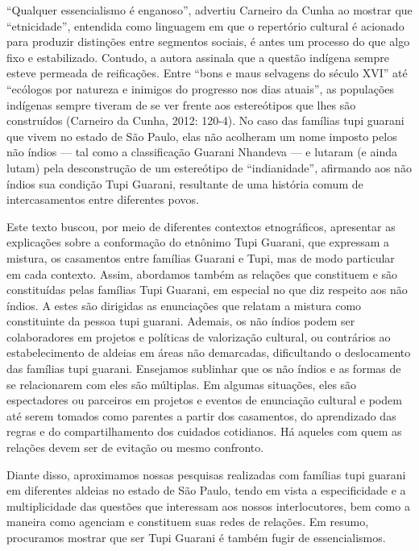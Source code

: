 ``Qualquer essencialismo é enganoso'', advertiu Carneiro da Cunha ao
mostrar que ``etnicidade'', entendida como linguagem em que o repertório
cultural é acionado para produzir distinções entre segmentos sociais, é
antes um processo do que algo fixo e estabilizado. Contudo, a autora
assinala que a questão indígena sempre esteve permeada de reificações.
Entre ``bons e maus selvagens do século XVI'' até ``ecólogos por natureza
e inimigos do progresso nos dias atuais'', as populações indígenas
sempre tiveram de se ver frente aos estereótipos que lhes são
construídos (Carneiro da Cunha, 2012: 120-4). No caso das famílias tupi
guarani que vivem no estado de São Paulo, elas não acolheram um nome
imposto pelos não índios — tal como a classificação Guarani Nhandeva —
e lutaram (e ainda lutam) pela desconstrução de um estereótipo de
``indianidade'', afirmando aos não índios sua condição Tupi Guarani,
resultante de uma história comum de intercasamentos entre diferentes
povos. 

Este texto buscou, por meio de diferentes contextos etnográficos,
apresentar as explicações sobre a conformação do etnônimo Tupi Guarani,
que expressam a mistura, os casamentos entre famílias Guarani e Tupi,
mas de modo particular em cada contexto. Assim, abordamos também as
relações que constituem e são constituídas pelas famílias Tupi Guarani,
em especial no que diz respeito aos não índios. A estes são dirigidas
as enunciações que relatam a mistura como constituinte da pessoa tupi
guarani. Ademais, os não índios podem ser colaboradores em projetos e
políticas de valorização cultural, ou contrários ao estabelecimento de
aldeias em áreas não demarcadas, dificultando o deslocamento das
famílias tupi guarani. Ensejamos sublinhar que os não índios e as
formas de se relacionarem com eles são múltiplas. Em algumas situações,
eles são espectadores ou parceiros em projetos e eventos de enunciação
cultural e podem até serem tomados como parentes a partir dos
casamentos, do aprendizado das regras e do compartilhamento dos
cuidados cotidianos. Há aqueles com quem as relações devem ser de
evitação ou mesmo confronto.

Diante disso, aproximamos nossas pesquisas realizadas com famílias tupi
guarani em diferentes aldeias no estado de São Paulo, tendo em vista a
especificidade e a multiplicidade das questões que interessam aos
nossos interlocutores, bem como a maneira como agenciam e constituem
suas redes de relações. Em resumo, procuramos mostrar que ser Tupi
Guarani é também fugir de essencialismos.

